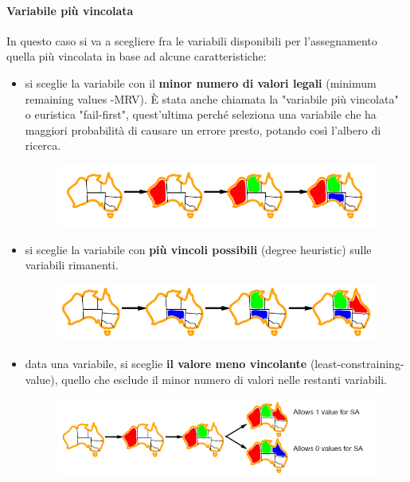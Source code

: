 \paragraph{Variabile più vincolata} In questo caso si va a scegliere fra le variabili disponibili per l'assegnamento quella più vincolata in base ad alcune caratteristiche:
\begin{itemize}
    \item si sceglie la variabile con il \textbf{minor numero di valori legali} (minimum remaining values -MRV). È stata anche chiamata la "variabile più vincolata" o euristica "fail-first", quest'ultima perché seleziona una variabile che ha maggiori probabilità di causare un errore presto, potando così l'albero di ricerca.
    \begin{figure}[H]
    	\centering
        \includegraphics[width=12cm, keepaspectratio]{img/impr_fewest_legal_values.png}
        \label{fig:fewest_legal_values}
    \end{figure}
    \item si sceglie la variabile con \textbf{più vincoli possibili} (degree heuristic) sulle variabili rimanenti.
    \begin{figure}[H]
    	\centering
        \includegraphics[width=12cm, keepaspectratio]{img/most_constraints.png}
        \label{fig:most_costraint}
    \end{figure}
    \item data una variabile, si sceglie \textbf{il valore meno vincolante} (least-constraining-value), quello che esclude il minor numero di valori nelle restanti variabili.
    \begin{figure}[H]
    	\centering
        \includegraphics[width=13cm, keepaspectratio]{img/least_constraining_value.png}
        \label{fig:least_constraining_value}
    \end{figure}
\end{itemize}

